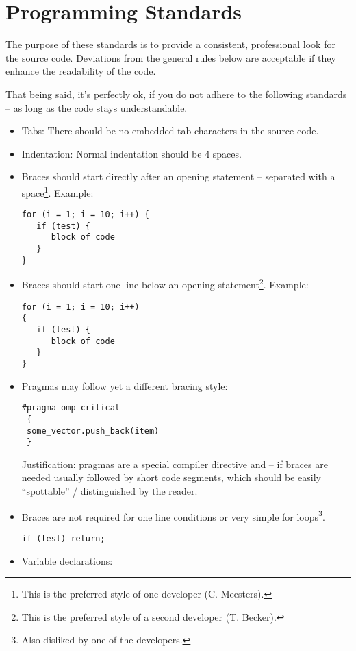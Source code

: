 \section{Programming Standards}

The purpose of these standards is to provide a consistent, professional look for the source code. Deviations from the general rules below are acceptable if they enhance the readability of the code.

That being said, it's perfectly ok, if you do not adhere to the following standards -- as long as the code stays understandable.

\begin{itemize}
 \item Tabs: There should be no embedded tab characters in the source code.
 \item Indentation: Normal indentation should be 4 spaces.
 \item Braces should start directly after an opening statement -- separated with a space\footnote{This is the preferred style of one developer (C. Meesters).}. Example:
\begin{lstlisting}[style=C++]
for (i = 1; i = 10; i++) {
   if (test) {
      block of code
   } 
}
\end{lstlisting}
\item Braces should start one line below an opening statement\footnote{This is the preferred style of a second developer (T. Becker).}. Example:
\begin{lstlisting}[style=C++]
for (i = 1; i = 10; i++)
{
   if (test) {
      block of code
   } 
}
\end{lstlisting}
 \item Pragmas may follow yet a different bracing style:
\begin{lstlisting}[style=C++]
 #pragma omp critical
 {
 some_vector.push_back(item)
 }
\end{lstlisting}
Justification: pragmas are a special compiler directive and -- if braces are needed usually followed by short code segments, which should be easily ``spottable'' / distinguished by the reader.
 \item Braces are not required for one line conditions or very simple for loops\footnote{Also disliked by one of the developers.}. 
\begin{lstlisting}[style=C++]
if (test) return;
\end{lstlisting}
 \item Variable declarations:
 \begin{enumerate}

\end{enumerate}
\end{itemize}
